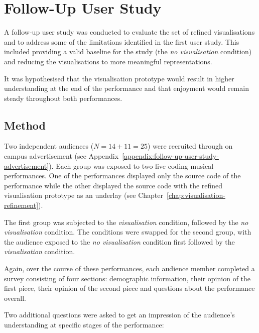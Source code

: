 
\chapter{Follow-Up User Study}
\label{chap:follow-up-user-study}

A follow-up user study was conducted to evaluate the set of refined visualisations and to address some of the limitations identified in the first user study. This included providing a valid baseline for the study (the \emph{no visualisation} condition) and reducing the visualisations to more meaningful representations.


It was hypothesised that the visualisation prototype would result in higher understanding at the end of the performance and that enjoyment would remain steady throughout both performances.

\section{Method}

Two independent audiences ($N=14+11=25$) were recruited through on campus advertisement (see Appendix~\ref{appendix:follow-up-user-study-advertisement}). Each group was exposed to two live coding musical performances. One of the performances displayed only the source code of the performance while the other displayed the source code with the refined visualisation prototype as an underlay (see Chapter~\ref{chap:visualisation-refinement}).

The first group was subjected to the \emph{visualisation} condition, followed by the \emph{no visualisation} condition. The conditions were swapped for the second group, with the audience exposed to the \emph{no visualisation} condition first followed by the \emph{visualisation} condition.

Again, over the course of these performances, each audience member completed a survey consisting of four sections: demographic information, their opinion of the first piece, their opinion of the second piece and questions about the performance overall. 

Two additional questions were asked to get an impression of the audience's understanding at specific stages of the performance:

